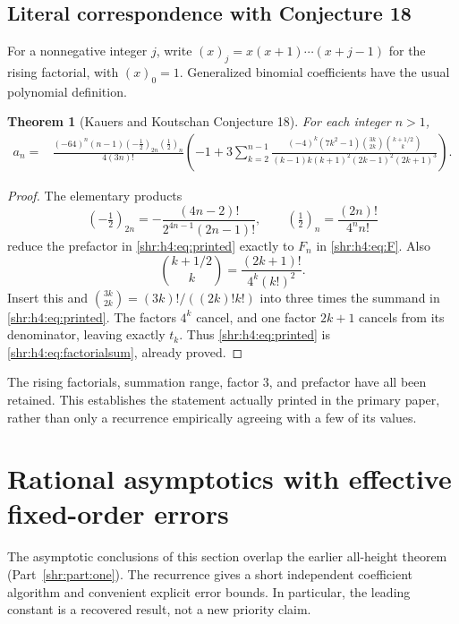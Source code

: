 \documentclass[11pt,letterpaper]{article}
\numberwithin{equation}{section}
\newtheorem{theorem}{Theorem}[section]
\theoremstyle{definition}
\newcommand{\1}{\mathbf 1}
\begin{document}
\subsection{Literal correspondence with Conjecture 18}
For a nonnegative integer $j$, write $(x)_j=x(x+1)\cdots(x+j-1)$ for
the rising factorial, with $(x)_0=1$. Generalized binomial coefficients
have the usual polynomial definition.

\begin{theorem}[Kauers and Koutschan Conjecture 18]
\label{shr:h4:thm:sum}
For each integer $n>1$,
\begin{align}
 a_n={}&\frac{(-64)^n(n-1)(-\tfrac12)_{2n}(\tfrac12)_n}{4(3n)!}
 \left(-1+3\sum_{k=2}^{n-1}
 \frac{(-4)^k(7k^2-1)\binom{3k}{2k}\binom{k+1/2}{k}}
 {(k-1)k(k+1)^2(2k-1)^2(2k+1)^3}\right).
 \label{shr:h4:eq:printed}
\end{align}
\end{theorem}
\begin{proof}
The elementary products
\begin{equation}
 (-\tfrac12)_{2n}=-\frac{(4n-2)!}{2^{4n-1}(2n-1)!},\qquad
 (\tfrac12)_n=\frac{(2n)!}{4^nn!}
 \label{shr:h4:eq:pochhammer}
\end{equation}
reduce the prefactor in \eqref{shr:h4:eq:printed} exactly to $F_n$ in
\eqref{shr:h4:eq:F}. Also
\[
 \binom{k+1/2}{k}=\frac{(2k+1)!}{4^k(k!)^2}.
\]
Insert this and $\binom{3k}{2k}=(3k)!/((2k)!k!)$ into three times the
summand in \eqref{shr:h4:eq:printed}. The factors $4^k$ cancel, and one factor
$2k+1$ cancels from its denominator, leaving exactly $t_k$.
Thus \eqref{shr:h4:eq:printed} is \eqref{shr:h4:eq:factorialsum}, already proved.
\end{proof}

The rising factorials, summation range, factor $3$, and prefactor have
all been retained. This establishes the statement actually printed in
the primary paper, rather than only a recurrence empirically agreeing
with a few of its values.

\section{Rational asymptotics with effective fixed-order errors}
\label{shr:h4:sec:asymptotics}
The asymptotic conclusions of this section overlap the earlier
all-height theorem (Part~\ref{shr:part:one}). The recurrence gives a short independent
coefficient algorithm and convenient explicit error bounds. In particular,
the leading constant is a recovered result, not a new priority claim.
\end{document}
